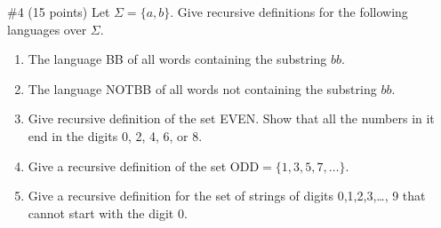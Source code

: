 \begin{problem}{\#4 (15 points)}
    Let \(\Sigma=\{a,b\}\).
    Give recursive definitions for the following languages over \(\Sigma\).
    \begin{enumerate}[label=\alph*)]
        \item The language BB of all words containing the substring \(bb\).
        \item The language NOTBB of all words not containing the substring \(bb\).
        \item Give recursive definition of the set EVEN.
        Show that all the numbers in it end in the digits 0, 2, 4, 6, or 8.
        \item Give a recursive definition of the set \(\text{ODD}=\{1,3,5,7,\ldots\}\).
        \item Give a recursive definition for the set of strings of digits 0,1,2,3,\ldots, 9 that cannot start with the digit 0.
    \end{enumerate}
\end{problem}
\vspace{2em}
